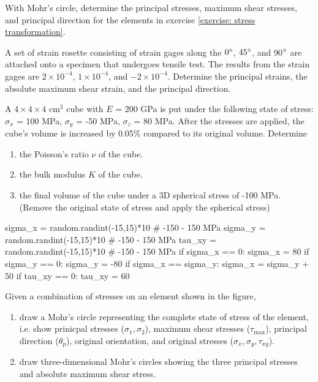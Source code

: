\documentclass[
fontsize=10pt,
a4paper,
twosides=false,
open=any,
svgnames,
]{kaobook} %
\begin{document}
\begin{exercises}
  \item With Mohr's circle, determine the principal stresses, maximum shear stresses, and principal direction for the elements in exercise \ref{exercise: stress transformation}.

  \item A set of strain rosette consisting of strain gages along the $0\degree$, $45\degree$, and 90$\degree$ are attached onto a specimen that undergoes tensile test. The results from the strain gages are $2 \times 10^{-4}$, $1 \times 10^{-4}$, and $ -2 \times 10^{-4}$. Determine the principal strains, the absolute maximum shear strain, and the principal direction.

  \item A $4 \times  4 \times 4$ cm$^3$ cube with $E$ = 200 GPa is put under the
  following state of stress: $\sigma_x$ = 100 MPa, $\sigma_y$ = -50
  MPa, $\sigma_z$ = 80 MPa. After the stresses are applied, the cube's
  volume is increased by 0.05\% compared to its original
  volume. Determine
  \begin{enumerate}
  \item the Poisson's ratio $\nu$ of the cube.
  \item the bulk modulus $K$ of the cube.
  \item the final volume of the cube under a 3D spherical stress of
    -100 MPa. (Remove the original state of stress and apply the
    spherical stress)
  \end{enumerate}

\begin{pycode}
sigma_x = random.randint(-15,15)*10 # -150 - 150 MPa
sigma_y = random.randint(-15,15)*10 # -150 - 150 MPa
tau_xy = random.randint(-15,15)*10 # -150 - 150 MPa
if sigma_x == 0: sigma_x = 80
if sigma_y == 0: sigma_y = -80
if sigma_x == sigma_y: sigma_x = sigma_y + 50
if tau_xy == 0: tau_xy = 60
\end{pycode}

  \item Given a combination of stresses on an element shown in the figure,

        \begin{enumerate}
          \item draw a Mohr's circle representing the complete state of stress of the element, i.e. show prinicpal stresses ($\sigma_{1}, \sigma_{2}$), maximum shear stresses ($\tau_{\max}$), principal direction ($\theta_{p}$), original orientation, and original stresses ($\sigma_{x}, \sigma_{y}, \tau_{xy}$).
          \item draw three-dimensional Mohr's circles showing the three principal stresses and absolute maximum shear stress.
        \end{enumerate}


\end{exercises}
\end{document}
